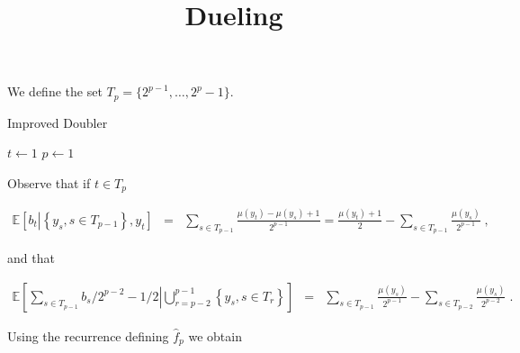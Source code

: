 \documentclass{article}
\numberwithin{equation}{section}
\theoremstyle{plain}
\theoremstyle{plain}
\theoremstyle{plain}
\theoremstyle{remark}
\theoremstyle{remark}
\newcommand{\1}{\ensuremath{\mathbbm{1}}}
\newcommand{\E}{\mathbb{E}}
\newcommand{\Dfrac}[2]{{\displaystyle \frac{#1}{#2}}}
\begin{document}
\title{Dueling}



\maketitle

We define the set $T_{p}=\{2^{p-1},\ldots,2^{p}-1\}$. 
\vspace{0.3cm}

\begin{algorithm}[H] 
\caption{Improved Doubler}
$t\gets 1$\;
$p\gets 1$\;
\end{algorithm}
\vspace{0.3cm}

Observe that if $t\in T_{p}$

\begin{eqnarray*}
\E\left[b_{t}\left|\left\{y_{s},s\in T_{p-1}\right\}, y_{t}\right.\right] &=& \sum_{s\in T_{p-1}}\Dfrac{\mu\left(y_{t}\right)-\mu\left(y_{s}\right)+1}{2^{p-1}} = \Dfrac{\mu\left(y_{t}\right)+1}{2}-\sum_{s\in T_{p-1}}\Dfrac{\mu\left(y_{s}\right)}{2^{p-1}}\;,
\end{eqnarray*}

and that

\begin{eqnarray*}
\E\left[\sum_{s\in T_{p-1}}b_{s}/2^{p-2}-1/2\left|\bigcup_{r=p-2}^{p-1}\left\{y_{s},s\in T_{r}\right\}\right.\right] &=& \sum_{s\in T_{p-1}}\Dfrac{\mu\left(y_{s}\right)}{2^{p-1}}-\sum_{s\in T_{p-2}}\Dfrac{\mu\left(y_{s}\right)}{2^{p-2}}\;.
\end{eqnarray*}

Using the recurrence defining $\hat{f}_{p}$ we obtain
\end{document}
